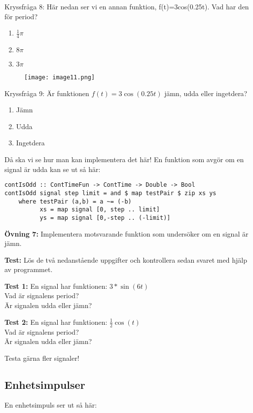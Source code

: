 \documentclass{article}
\begin{document}
Kryssfråga 8: Här nedan ser vi en annan funktion, f(t)=3cos(0.25t). Vad har den för period?
\begin{enumerate}[label={\alph*)},font={\bfseries}]
    \item $\frac{1}{4}\pi$
    \item $8\pi$
    \item $3\pi$
\end{enumerate}
\newpage
\begin{figure}[ht]
\centerline{\texttt{[image: image11.png]}}
\caption{}
\label{}
\end{figure}

Kryssfråga 9: Är funktionen $f(t)=3\cos(0.25t)$ jämn, udda eller ingetdera?
\begin{enumerate}[label={\alph*)},font={\bfseries}]
    \item Jämn
    \item Udda
    \item Ingetdera
\end{enumerate}


Då ska vi se hur man kan implementera det här! En funktion som avgör om en signal är udda kan se ut så här:
\begin{verbatim}
contIsOdd :: ContTimeFun -> ContTime -> Double -> Bool
contIsOdd signal step limit = and $ map testPair $ zip xs ys
    where testPair (a,b) = a ~= (-b)
          xs = map signal [0, step .. limit]
          ys = map signal [0,-step .. (-limit)]
\end{verbatim}

\textbf{Övning 7:} Implementera motsvarande funktion som undersöker om en signal är jämn.

\textbf{Test:} Lös de två nedanstående uppgifter och kontrollera sedan svaret med hjälp av programmet. 

\textbf{Test 1:}
En signal har funktionen: $3*\sin(6t)$\\
Vad är signalens period?\\
Är signalen udda eller jämn?

\textbf{Test 2:}
En signal har funktionen: $\frac{1}{2} \cos(t)$\\
Vad är signalens period?\\
Är signalen udda eller jämn?

Testa gärna fler signaler!

\subsection{Enhetsimpulser}
En enhetsimpuls ser ut så här:
\end{document}
